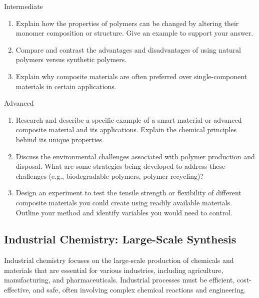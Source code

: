 \begin{tieredquestions}{Intermediate}
\begin{enumerate}
    \item Explain how the properties of polymers can be changed by altering their monomer composition or structure. Give an example to support your answer.
    \item Compare and contrast the advantages and disadvantages of using natural polymers versus synthetic polymers.
    \item Explain why composite materials are often preferred over single-component materials in certain applications.
\end{enumerate}
\end{tieredquestions}

\begin{tieredquestions}{Advanced}
\begin{enumerate}
    \item Research and describe a specific example of a smart material or advanced composite material and its applications. Explain the chemical principles behind its unique properties.
    \item Discuss the environmental challenges associated with polymer production and disposal. What are some strategies being developed to address these challenges (e.g., biodegradable polymers, polymer recycling)?
    \item Design an experiment to test the tensile strength or flexibility of different composite materials you could create using readily available materials. Outline your method and identify variables you would need to control.
\end{enumerate}
\end{tieredquestions}

\subsection{Industrial Chemistry: Large-Scale Synthesis}

Industrial chemistry focuses on the large-scale production of chemicals and materials that are essential for various industries, including agriculture, manufacturing, and pharmaceuticals.  Industrial processes must be efficient, cost-effective, and safe, often involving complex chemical reactions and engineering.


